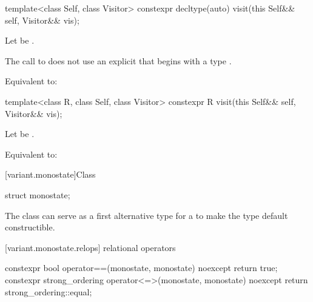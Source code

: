 %
\begin{itemdecl}
template<class Self, class Visitor>
  constexpr decltype(auto) visit(this Self&& self, Visitor&& vis);
\end{itemdecl}

\begin{itemdescr}
\pnum
Let  be
.

\pnum
\constraints
The call to  does not use
an explicit  that
begins with a type .

\pnum
\effects
Equivalent to: 
\end{itemdescr}

%
\begin{itemdecl}
template<class R, class Self, class Visitor>
  constexpr R visit(this Self&& self, Visitor&& vis);
\end{itemdecl}

\begin{itemdescr}
\pnum
Let  be
.

\pnum
\effects
Equivalent to: 
\end{itemdescr}

[variant.monostate]{Class }%
%

\begin{itemdecl}
struct monostate{};
\end{itemdecl}

\begin{itemdescr}
\pnum
The class  can serve as a first alternative type for
a  to make the  type default constructible.
\end{itemdescr}


[variant.monostate.relops]{ relational operators}

%
%
\begin{itemdecl}
constexpr bool operator==(monostate, monostate) noexcept { return true; }
constexpr strong_ordering operator<=>(monostate, monostate) noexcept
{ return strong_ordering::equal; }
\end{itemdecl}

